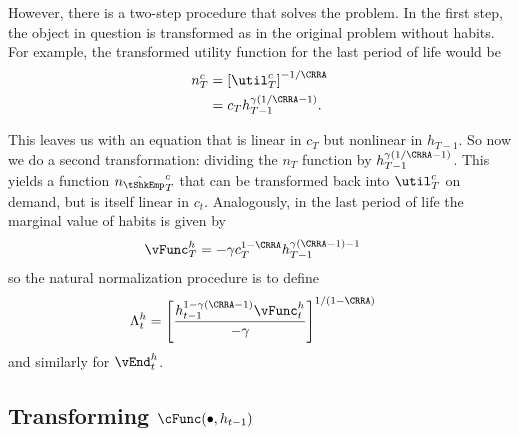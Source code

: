 \documentclass[titlepage]{\econtex}
\begin{document}
{  However, there is a two-step procedure that solves the problem.  In
  the first step, the object in question is transformed as in the
  original problem without habits.  For example, the transformed utility
  function for the last period of life would be
  \begin{equation}\begin{gathered}\begin{aligned}
    n_{T}^{c}  & = \left[\util^{c}_{T}\right]^{-1/\CRRA}
    \\        & = {c}_{T}h_{T-1}^{\gamma(1/\CRRA-1)}.
  \end{aligned}\end{gathered}\end{equation}

  This leaves us with an equation that is linear in ${c}_{T}$ but
  nonlinear in $h_{T-1}$.  So now we do a second transformation:
  dividing the $n_{T}$ function by $h_{T-1}^{\gamma(1/\CRRA-1)}$.  This
  yields a function $\hat{n_{\tShkEmp}}_{T}^{c}$ that can be transformed back into
  $\util^{c}_{T}$ on demand, but is itself linear in ${c}_{t}.$  Analogously,
  in the last period of life the marginal value of habits is given by
  \begin{equation*}\begin{gathered}\begin{aligned}
    {\vFunc}_{T}^{h}  & = -\gamma {c}_{T}^{1-\CRRA}h_{T-1}^{\gamma(\CRRA-1)-1}
  \end{aligned}\end{gathered}\end{equation*}
  so the natural normalization procedure is to define
  \begin{equation}\begin{gathered}\begin{aligned}
    \Lambda_{t}^{h} 
& =                           \left[\frac{h_{t-1}^{1-\gamma(\CRRA-1)}{\vFunc}_{t}^{h}}{-\gamma}\right]^{1/(1-\CRRA)}
  \end{aligned}\end{gathered}\end{equation}
  and similarly for $\vEnd_{t}^{h}$.


  \hypertarget{Transforming-cFunc}{}
  \subsection{Transforming $\cFunc(\bullet,h_{t-1})$}

}
\end{document}
